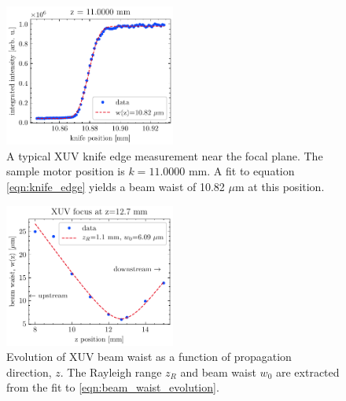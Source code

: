 \begin{figure}
	\centering
	\includegraphics[width=0.5\textwidth]{figures/chap3/XUV_focus_knife_edge.pdf}
	\caption{A typical XUV knife edge measurement near the focal plane. The sample motor position is $k=11.0000$ mm. A fit to equation \cref{eqn:knife_edge} yields a beam waist of 10.82 $\mu$m at this position.}
	\label{fig:XUV_focus_knife_edge}
\end{figure}

\begin{figure}
	\centering
	\includegraphics[width=0.5\textwidth]{figures/chap3/XUV_waist_vs_k.pdf}
	\caption{Evolution of XUV beam waist as a function of propagation direction, $z$. The Rayleigh range $z_R$ and beam waist $w_0$ are extracted from the fit to \cref{eqn:beam_waist_evolution}.}
	\label{fig:XUV_waist_vs_k}
\end{figure}

